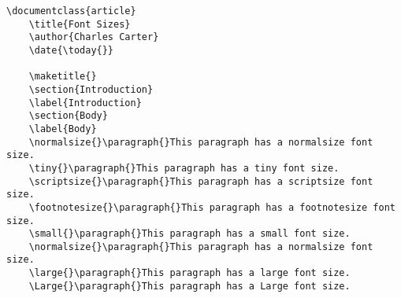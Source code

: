         \begin{verbatim}
\documentclass{article}
    \title{Font Sizes}
    \author{Charles Carter}
    \date{\today{}}
 
    \maketitle{}
    \section{Introduction}
    \label{Introduction}
    \section{Body}
    \label{Body}
    \normalsize{}\paragraph{}This paragraph has a normalsize font size.
    \tiny{}\paragraph{}This paragraph has a tiny font size.
    \scriptsize{}\paragraph{}This paragraph has a scriptsize font size.
    \footnotesize{}\paragraph{}This paragraph has a footnotesize font size.
    \small{}\paragraph{}This paragraph has a small font size.
    \normalsize{}\paragraph{}This paragraph has a normalsize font size.
    \large{}\paragraph{}This paragraph has a large font size.
    \Large{}\paragraph{}This paragraph has a Large font size.

\end{verbatim}
